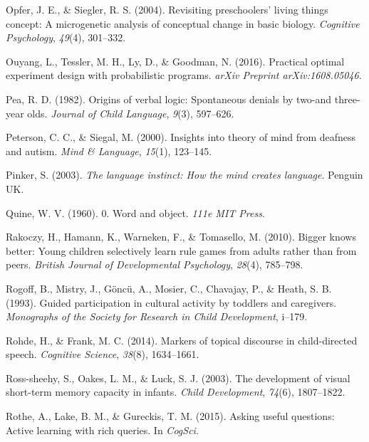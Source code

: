 \documentclass[oneside]{report}
\begin{document}
\leavevmode\hypertarget{ref-opfer2004revisiting}{}%
Opfer, J. E., \& Siegler, R. S. (2004). Revisiting preschoolers' living
things concept: A microgenetic analysis of conceptual change in basic
biology. \emph{Cognitive Psychology}, \emph{49}(4), 301--332.

\leavevmode\hypertarget{ref-ouyang2016practical}{}%
Ouyang, L., Tessler, M. H., Ly, D., \& Goodman, N. (2016). Practical
optimal experiment design with probabilistic programs. \emph{arXiv
Preprint arXiv:1608.05046}.

\leavevmode\hypertarget{ref-pea1982origins}{}%
Pea, R. D. (1982). Origins of verbal logic: Spontaneous denials by
two-and three-year olds. \emph{Journal of Child Language}, \emph{9}(3),
597--626.

\leavevmode\hypertarget{ref-peterson2000insights}{}%
Peterson, C. C., \& Siegal, M. (2000). Insights into theory of mind from
deafness and autism. \emph{Mind \& Language}, \emph{15}(1), 123--145.

\leavevmode\hypertarget{ref-pinker2003language}{}%
Pinker, S. (2003). \emph{The language instinct: How the mind creates
language}. Penguin UK.

\leavevmode\hypertarget{ref-quine19600}{}%
Quine, W. V. (1960). 0. Word and object. \emph{111e MIT Press}.

\leavevmode\hypertarget{ref-rakoczy2010bigger}{}%
Rakoczy, H., Hamann, K., Warneken, F., \& Tomasello, M. (2010). Bigger
knows better: Young children selectively learn rule games from adults
rather than from peers. \emph{British Journal of Developmental
Psychology}, \emph{28}(4), 785--798.

\leavevmode\hypertarget{ref-rogoff1993guided}{}%
Rogoff, B., Mistry, J., Göncü, A., Mosier, C., Chavajay, P., \& Heath,
S. B. (1993). Guided participation in cultural activity by toddlers and
caregivers. \emph{Monographs of the Society for Research in Child
Development}, i--179.

\leavevmode\hypertarget{ref-rohde2014markers}{}%
Rohde, H., \& Frank, M. C. (2014). Markers of topical discourse in
child-directed speech. \emph{Cognitive Science}, \emph{38}(8),
1634--1661.

\leavevmode\hypertarget{ref-ross2003development}{}%
Ross-sheehy, S., Oakes, L. M., \& Luck, S. J. (2003). The development of
visual short-term memory capacity in infants. \emph{Child Development},
\emph{74}(6), 1807--1822.

\leavevmode\hypertarget{ref-rothe2015asking}{}%
Rothe, A., Lake, B. M., \& Gureckis, T. M. (2015). Asking useful
questions: Active learning with rich queries. In \emph{CogSci}.
\end{document}
